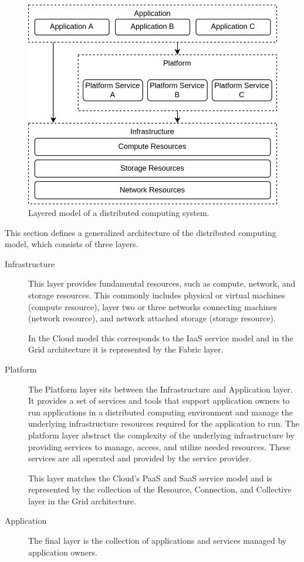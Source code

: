 \begin{figure}[H]
  \centering
  \includegraphics[width=0.7\linewidth]{resources/distributed-computing-overview.drawio.png}
  \caption{Layered model of a distributed computing system.}
\end{figure}

This section defines a generalized architecture of the distributed computing
model, which consists of three layers.

\begin{description}
  \item[Infrastructure]
    This layer provides fundamental resources, such as compute, network, and
    storage resources. This commonly includes physical or virtual machines
    (compute resource), layer two or three networks connecting machines (network
    resource), and network attached storage (storage resource).

    In the Cloud model this corresponds to the IaaS service model and in the
    Grid architecture it is represented by the Fabric layer.
  \item[Platform]
    The Platform layer sits between the Infrastructure and Application layer. It
    provides a set of services and tools that support application owners to run
    applications in a distributed computing environment and manage the
    underlying infrastructure resources required for the application to run. The
    platform layer abstract the complexity of the underlying infrastructure by
    providing services to manage, access, and utilize needed resources. These
    services are all operated and provided by the service provider.

    This layer matches the Cloud's PaaS and SaaS service model and is
    represented by the collection of the Resource, Connection, and Collective
    layer in the Grid architecture.
  \item[Application]
    The final layer is the collection of applications and services managed by
    application owners.
\end{description}

